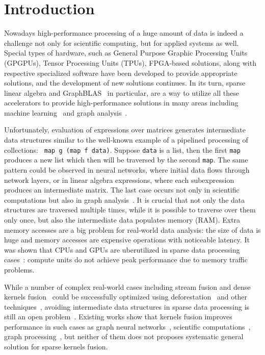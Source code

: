 \section{Introduction}

Nowadays high-performance processing of a huge amount of data is indeed a challenge not only for scientific computing, but for applied systems as well.
Special types of hardware, such as General Purpose Graphic Processing Units (GPGPUs), Tensor Processing Units (TPUs), FPGA-based solutions, along with respective specialized software have been developed to provide appropriate solutions, and the development of new solutions continues.
In its turn, sparse linear algebra and GraphBLAS~\cite{buluc2017graphblas} in particular, are a way to utilize all these accelerators to provide high-performance solutions in many areas including machine learning~\cite{Kepner2017} and graph analysis~\cite{graphblast}.

Unfortunately, evaluation of expressions over matrices generates intermediate data structures similar to the well-known example of a pipelined processing of collections: \verb| map g (map f data)|. Suppose \verb|data| is a list, then the first \verb|map| produces a new list which then will be traversed by the second \verb|map|. The same pattern could be observed in neural networks, where initial data flows through network layers, or in linear algebra expressions, where each subexpression produces an intermediate matrix. 
The last case occurs not only in scientific computations but also in graph analysis~\cite{graphblast}.
It is crucial that not only the data structures are traversed multiple times, while it is possible to traverse over them only once, but also the intermediate data populates memory (RAM).
Extra memory accesses are a big problem for real-world data analysis: the size of data is huge and memory accesses are expensive operations with noticeable latency. It was shown that CPUs and GPUs are uberutilized in sparse data processing cases~\cite{Zhang2020SpArchEA, 7761635}: compute units do not achieve peak performance due to memory traffic problems.

While a number of complex real-world cases including stream fusion and dense kernels fusion~\cite{fusion-boosting-memory-computations} could be successfully optimized using deforestation~\cite{wadler-deforestation,wadler-deforestation-ho} and other techniques~\cite{Futhark,StreamFus}, avoiding intermediate data structures in sparse data processing is still an open problem~\cite{graphblast}.
Existing works show that kernels fusion improves performance in such cases as graph neural networks~\cite{HidayetogluPMEX20}, scientific computations~\cite{10.1007/978-3-662-48096-0-52}, graph processing~\cite{GraphColoringGpuFusion}, but neither of them does not proposes systematic general solution for sparse kernels fusion. 